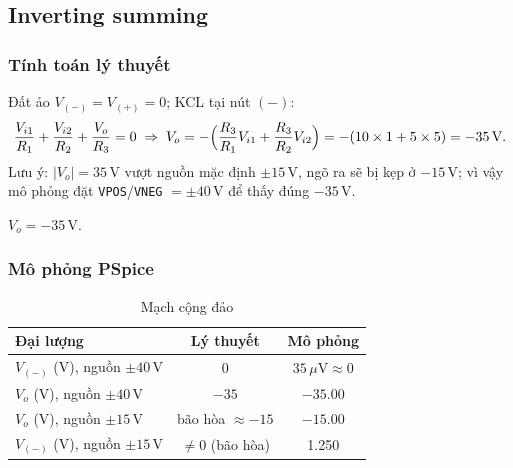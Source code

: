 \subsection{Inverting summing \bonus}\label{sec:summing-b}

\subsubsection*{Tính toán lý thuyết}
Đất ảo $V_{(-)} = V_{(+)} = 0$; KCL tại nút $(-)$:
\[
\frac{V_{i1}}{R_1} + \frac{V_{i2}}{R_2} + \frac{V_o}{R_3} = 0
\;\Rightarrow\;
V_o = -\Bigl(\frac{R_3}{R_1}V_{i1} + \frac{R_3}{R_2}V_{i2}\Bigr)
= -(10 \times 1 + 5 \times 5) = -35\,\text{V}.
\]
Lưu ý: $|V_o| = 35\,\text{V}$ vượt nguồn mặc định $\pm 15\,\text{V}$, ngõ ra sẽ bị kẹp ở $-15\,\text{V}$; vì vậy mô phỏng đặt \texttt{VPOS}/\texttt{VNEG} $=\pm 40\,\text{V}$ để thấy đúng $-35\,\text{V}$.

\begin{dapsobox}
$V_o = -35\,\text{V}$.
\end{dapsobox}

\subsubsection*{Mô phỏng PSpice}
\simresult
{}
\begin{table}[H]
\centering
\begin{tabular}{l c c}
\toprule
\textbf{Đại lượng} & \textbf{Lý thuyết} & \textbf{Mô phỏng}\\
\midrule
$V_{(-)}$ (V), nguồn $\pm 40\,\text{V}$ & 0     & $35\,\mu\text{V} \approx 0$\\
$V_o$ (V), nguồn $\pm 40\,\text{V}$     & $-35$ & $-35.00$\\
$V_o$ (V), nguồn $\pm 15\,\text{V}$     & bão hòa $\approx -15$ & $-15.00$\\
$V_{(-)}$ (V), nguồn $\pm 15\,\text{V}$ & $\neq 0$ (bão hòa) & 1.250\\
\bottomrule
\end{tabular}
\caption{Mạch cộng đảo}
\end{table}
